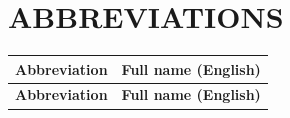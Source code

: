 \thispagestyle{plain}

\section*{ABBREVIATIONS}
{}

\begingroup
\centering
\renewcommand{\arraystretch}{1.25}
\setlength{\LTleft}{0.06\textwidth}
\setlength{\LTright}{0.06\textwidth}

\begin{longtable}{|>{\bfseries\centering\arraybackslash}p{}|>{\centering\arraybackslash}p{}|}
    \hline
    \textbf{Abbreviation} & \textbf{Full name (English)} \\
    \hline
    \endfirsthead

    \hline
    \textbf{Abbreviation} & \textbf{Full name (English)} \\
    \hline
    \endhead


\end{longtable}
